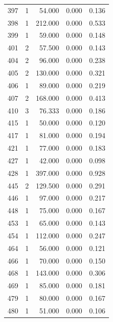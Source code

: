 \begin{table}
\begin{tabular}{rrrrr}
 397 &      1 &         54.000 &        0.000 &           0.136 \\
 398 &      1 &        212.000 &        0.000 &           0.533 \\
 399 &      1 &         59.000 &        0.000 &           0.148 \\
 401 &      2 &         57.500 &        0.000 &           0.143 \\
 404 &      2 &         96.000 &        0.000 &           0.238 \\
 405 &      2 &        130.000 &        0.000 &           0.321 \\
 406 &      1 &         89.000 &        0.000 &           0.219 \\
 407 &      2 &        168.000 &        0.000 &           0.413 \\
 410 &      3 &         76.333 &        0.000 &           0.186 \\
 415 &      1 &         50.000 &        0.000 &           0.120 \\
 417 &      1 &         81.000 &        0.000 &           0.194 \\
 421 &      1 &         77.000 &        0.000 &           0.183 \\
 427 &      1 &         42.000 &        0.000 &           0.098 \\
 428 &      1 &        397.000 &        0.000 &           0.928 \\
 445 &      2 &        129.500 &        0.000 &           0.291 \\
 446 &      1 &         97.000 &        0.000 &           0.217 \\
 448 &      1 &         75.000 &        0.000 &           0.167 \\
 453 &      1 &         65.000 &        0.000 &           0.143 \\
 454 &      1 &        112.000 &        0.000 &           0.247 \\
 464 &      1 &         56.000 &        0.000 &           0.121 \\
 466 &      1 &         70.000 &        0.000 &           0.150 \\
 468 &      1 &        143.000 &        0.000 &           0.306 \\
 469 &      1 &         85.000 &        0.000 &           0.181 \\
 479 &      1 &         80.000 &        0.000 &           0.167 \\
 480 &      1 &         51.000 &        0.000 &           0.106 \\

\end{tabular}
\end{table}
